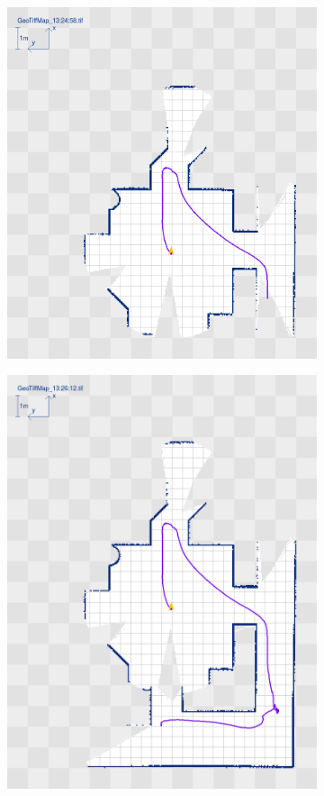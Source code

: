 \documentclass[a4paper]{article}
\begin{document}
\begin{figure}[h!]
\begin{subfigure}[b]{0.4\textwidth}
    \includegraphics[width=\textwidth,height=\textheight,keepaspectratio]{img/move_square/2.png}
  \end{subfigure}
  \begin{subfigure}[b]{0.4\textwidth}
    \includegraphics[width=\textwidth,height=\textheight,keepaspectratio]{img/move_square/3.png}

\end{subfigure}
\end{figure}
\end{document}
